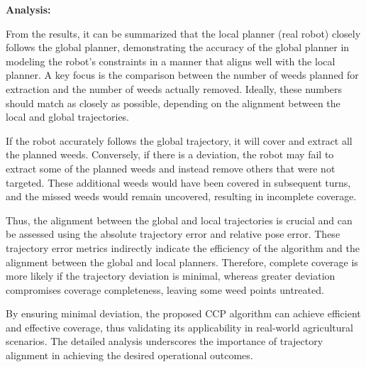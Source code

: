 \vspace{3mm}    


\textbf{Analysis: } 

From the results, it can be summarized that the local planner (real robot) closely follows the global planner, demonstrating the accuracy of the global planner in modeling the robot's constraints in a manner that aligns well with the local planner. A key focus is the comparison between the number of weeds planned for extraction and the number of weeds actually removed. Ideally, these numbers should match as closely as possible, depending on the alignment between the local and global trajectories.

\vspace{3mm}   

If the robot accurately follows the global trajectory, it will cover and extract all the planned weeds. Conversely, if there is a deviation, the robot may fail to extract some of the planned weeds and instead remove others that were not targeted. These additional weeds would have been covered in subsequent turns, and the missed weeds would remain uncovered, resulting in incomplete coverage.

\vspace{3mm}   

Thus, the alignment between the global and local trajectories is crucial and can be assessed using the absolute trajectory error and relative pose error. These trajectory error metrics indirectly indicate the efficiency of the algorithm and the alignment between the global and local planners. Therefore, complete coverage is more likely if the trajectory deviation is minimal, whereas greater deviation compromises coverage completeness, leaving some weed points untreated.

\vspace{3mm}   

By ensuring minimal deviation, the proposed CCP algorithm can achieve efficient and effective coverage, thus validating its applicability in real-world agricultural scenarios. The detailed analysis underscores the importance of trajectory alignment in achieving the desired operational outcomes.
